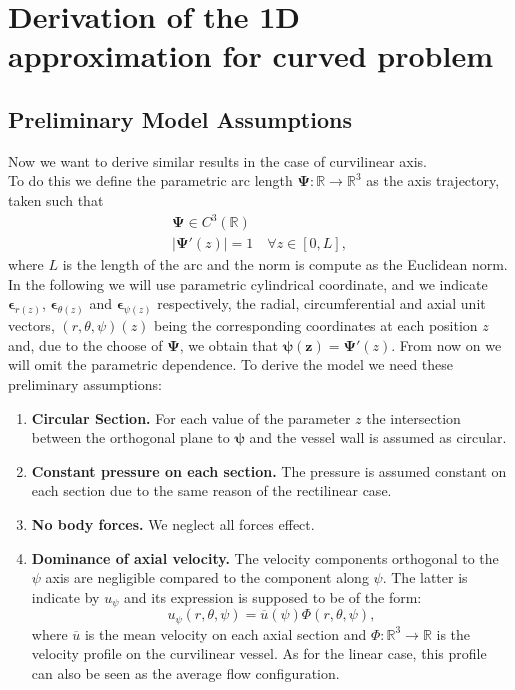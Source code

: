 \documentclass[a4paper]{report}
\begin{document}
\section{Derivation of the 1D approximation for curved problem}
\subsection{Preliminary Model  Assumptions}
Now we want to derive similar results in the case of curvilinear axis.\\
To do this we define the parametric arc length $\boldsymbol{\Psi}: \mathbb{R} \rightarrow \mathbb{R}^3$ as the axis trajectory, taken such that
\begin{equation}
\begin{split}
\boldsymbol{\Psi} \in C^3(\mathbb{R}) \\
| \boldsymbol{\Psi} ' (z) | = 1 \quad \forall z \in [0,L],
\end{split}
\end{equation}
where $L$ is the length of the arc  and the norm is compute as the Euclidean norm.
In the following we will use parametric cylindrical coordinate, and we indicate $\boldsymbol{\epsilon}_{r(z)}$, $\boldsymbol{\epsilon}_{\theta(z)}$ and $\boldsymbol{\epsilon}_{\psi(z)}$ respectively, the radial, circumferential and axial unit vectors, $(r,\theta,\psi)(z)$ being the corresponding coordinates at each position $z$ and, due to the choose of $\boldsymbol{\Psi}$, we obtain that $\boldsymbol{\psi (z)}=\boldsymbol{\Psi}'(z)$.
From now on we will omit the parametric dependence.
To derive the model we need these preliminary assumptions:
	

	\begin{enumerate}
	\item\textbf{Circular Section.} For each value of the parameter $z$ the intersection between the orthogonal plane to $\boldsymbol{\psi }$ and the vessel wall is assumed as circular.
	\item \textbf{Constant pressure on each section.} The pressure is assumed constant on each section due to the same reason of the rectilinear case.
	\item \textbf{No body forces.} We neglect all forces effect.
	\item \textbf{Dominance of axial velocity.} The velocity components orthogonal to the $\psi$  axis are negligible compared to the component along $\psi$. The latter is indicate by $u_{\psi}$ and its expression is supposed to be of the form:
	\begin{equation}
 	u_{\psi}(r,\theta,\psi)= \overline{u}(\psi) \Phi (r,\theta,\psi),
	\end{equation}
where $\overline{u}$ is the mean velocity on each axial section and $\Phi :\mathbb{R}^3 \rightarrow \mathbb{R}$ is the velocity profile on the curvilinear vessel. As for the linear case, this profile can also be seen as the average flow configuration.
	\end{enumerate}
\end{document}
